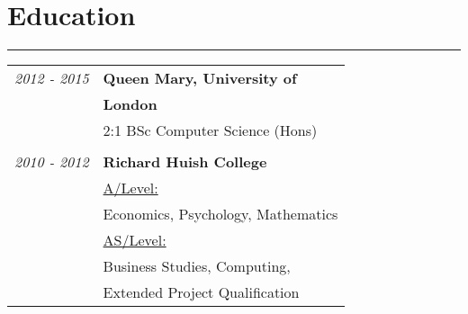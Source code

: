 \section*{\Large \bf \color{Maroon} Education}
\hrule \smallskip
\begin{tabular}{r l}
\textit{2012 - 2015} & \textbf{Queen Mary, University of} \\
 & \textbf{London}\\
 & 2:1 BSc Computer Science (Hons) \\ \\
\textit{2010 - 2012} & \textbf{Richard Huish College} \\
 & \underline{A/Level:} \\
 & Economics, Psychology, Mathematics \\
 & \underline{AS/Level:} \\
 & Business Studies, Computing, \\
 & Extended Project Qualification
\end{tabular}
